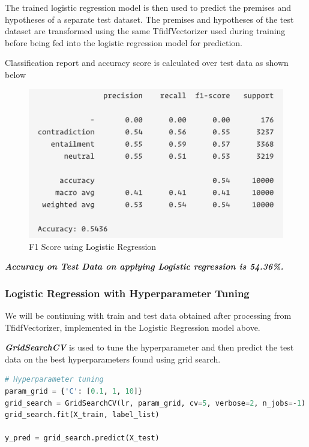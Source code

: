 The trained logistic regression model is then used to predict the premises and hypotheses of a separate test dataset. The premises and hypotheses of the test dataset are transformed using the same TfidfVectorizer used during training before being fed into the logistic regression model for prediction.

Classification report and accuracy score is calculated over test data as shown below

\begin{figure}[h]
	\centering
	\includegraphics[scale=0.7]{img/logicf1.png}
	\caption{F1 Score using Logistic Regression}
\end{figure}

\textit{\textbf{Accuracy on Test Data on applying Logistic regression is 54.36\%.}}


\subsubsection{Logistic Regression with Hyperparameter Tuning}

We will be continuing with train and test data obtained after processing from TfidfVectorizer, implemented in the Logistic Regression model above. 

\textit{\textbf{GridSearchCV}}\cite{gdsearch} is used to tune the hyperparameter and then predict the test data on the best hyperparameters found using grid search.


\begin{lstlisting}[language=Python]
# Hyperparameter tuning
param_grid = {'C': [0.1, 1, 10]}
grid_search = GridSearchCV(lr, param_grid, cv=5, verbose=2, n_jobs=-1)
grid_search.fit(X_train, label_list)

y_pred = grid_search.predict(X_test)
\end{lstlisting}


